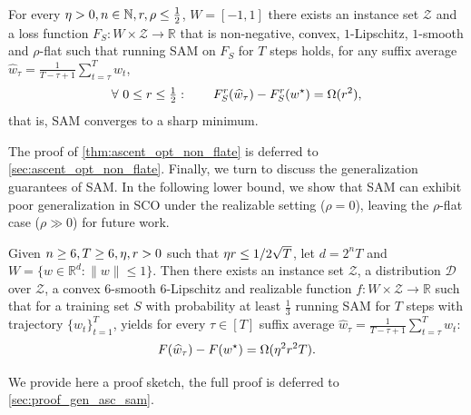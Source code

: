 \begin{theorem}\label{thm:ascent_opt_non_flate}
    For every $\eta> 0, n \in \mathbb{N}, r,\rho \leq \frac{1}{2}$, $W = [-1,1]$ there exists an instance set $\mathcal{Z}$ and a loss function $F_S:W \times \mathcal{Z} \to \mathbb{R}$ that is non-negative, convex, $1$-Lipschitz, $1$-smooth and $\rho$-flat such that running SAM on $F_S$ for $T$ steps holds, for any suffix average $\widehat{w}_{\tau} = \frac{1}{T-\tau+1}\sum_{t = \tau}^T w_t$,
    $$\forall ~ 0\leq r \leq \tfrac{1}{2}: \qquad F_S^{r}(\widehat{w}_{\tau}) - F_S^{r}(w^{\star}) = \Omega(r^2),$$
    that is, SAM converges to a sharp minimum.
\end{theorem}
The proof of \cref{thm:ascent_opt_non_flate} is deferred to \cref{sec:ascent_opt_non_flate}.
Finally, we turn to discuss the generalization guarantees of SAM.
In the following lower bound, we show that SAM can exhibit poor generalization in SCO under the realizable setting ($\rho = 0$), leaving the $\rho$-flat case ($\rho \gg 0$) for future work. 
\begin{theorem}\label{thm: gen asc sam}
    Given $n \geq 6 ,T \geq 6, \eta,r>0$ such that $\eta r \leq 1/2\sqrt{T}$, let $d = 2^n T$ and $W = \{w \in \mathbb{R}^d: \|w\| \leq 1\}$. 
    Then there exists an instance set $\mathcal{Z}$, a distribution $\mathcal{D}$ over $\mathcal{Z}$, a convex $6$-smooth $6$-Lipschitz and realizable function $f: W \times \mathcal{Z} \to \mathbb{R}$ such that for a training set $S$ with probability at least $\frac{1}{3}$ running SAM for $T$ steps with trajectory $\{w_t\}_{t=1}^T$, yields for every $\tau \in [T]$ suffix average $\widehat{w}_{\tau} = \frac{1}{T-\tau +1} \sum_{t=\tau}^T w_t$:
    \[F(\widehat{w}_{\tau}) - F(w^{\star}) = \Omega(\eta^2 r^2 T).\]
\end{theorem}
We provide here a proof sketch, the full proof is deferred to \cref{sec:proof_gen_asc_sam}.
